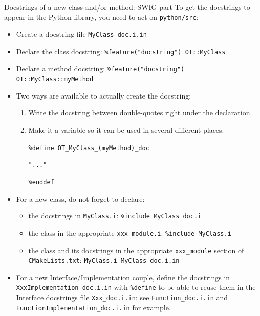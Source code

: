 \documentclass[8pt]{beamer}
\begin{document}
\begin{frame}{Docstrings of a new class and/or method: SWIG part}
To get the \alert{docstrings} to appear \alert{in the Python library}, you need to act on \alert{\texttt{python/src}}:
\begin{itemize}
    \item Create a \alert{docstring file} \texttt{MyClass\_doc.i.in}
    \item Declare the \alert{class docstring}: \texttt{\%feature("docstring") OT::MyClass}
    \item Declare a \alert{method docstring}: \texttt{\%feature("docstring") OT::MyClass::myMethod}
    \item Two ways are available to actually create the docstring:
    \begin{enumerate}
        \item Write the docstring between double-quotes \alert{right under the declaration}.
        \item \alert{Make it a variable} so it can be used in several different places:

        \texttt{\%define OT\_MyClass\_(myMethod)\_doc}

        \texttt{"..."}

        \texttt{\%enddef}
    \end{enumerate}
    \item For a new class, \alert{do not forget to declare}:
    \begin{itemize}
        \item the docstrings in \alert{\texttt{MyClass.i}}: \texttt{\%include MyClass\_doc.i}
        \item the class in the appropriate \alert{\texttt{xxx\_module.i}}: \texttt{\%include MyClass.i}
        \item the class and its docstrings in the appropriate \texttt{xxx\_module} section of \alert{\texttt{CMakeLists.txt}}: \texttt{MyClass.i MyClass\_doc.i.in}
    \end{itemize}    
    \item For a new Interface/Implementation couple, define the docstrings in \texttt{XxxImplementation\_doc.i.in} with \alert{\texttt{\%define}} to be able to reuse them in the Interface docstrings file \texttt{Xxx\_doc.i.in}: see \href{https://github.com/openturns/openturns/blob/master/python/src/Function_doc.i.in}{\texttt{Function\_doc.i.in}} and \href{https://github.com/openturns/openturns/blob/master/python/src/FunctionImplementation_doc.i.in}{\texttt{FunctionImplementation\_doc.i.in}} for example.
\end{itemize}
\end{frame}
\end{document}
